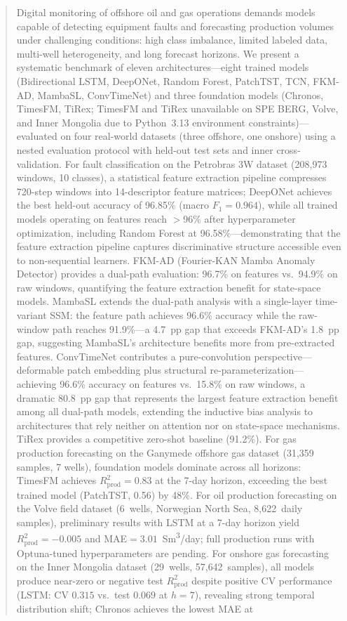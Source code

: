 \documentclass[conference]{IEEEtran}
\begin{document}
\begin{abstract}
Digital monitoring of offshore oil and gas operations demands models capable of detecting equipment faults and forecasting production volumes under challenging conditions: high class imbalance, limited labeled data, multi-well heterogeneity, and long forecast horizons. We present a systematic benchmark of eleven architectures---eight trained models (Bidirectional LSTM, DeepONet, Random Forest, PatchTST, TCN, FKM-AD, MambaSL, ConvTimeNet) and three foundation models (Chronos, TimesFM, TiRex; TimesFM and TiRex unavailable on SPE BERG, Volve, and Inner Mongolia due to Python~3.13 environment constraints)---evaluated on four real-world datasets (three offshore, one onshore) using a nested evaluation protocol with held-out test sets and inner cross-validation. For fault classification on the Petrobras 3W dataset (208{,}973 windows, 10 classes), a statistical feature extraction pipeline compresses 720-step windows into 14-descriptor feature matrices; DeepONet achieves the best held-out accuracy of 96.85\% (macro $F_1{=}0.964$), while all trained models operating on features reach $>$96\% after hyperparameter optimization, including Random Forest at 96.58\%---demonstrating that the feature extraction pipeline captures discriminative structure accessible even to non-sequential learners. FKM-AD (Fourier-KAN Mamba Anomaly Detector) provides a dual-path evaluation: 96.7\% on features vs.\ 94.9\% on raw windows, quantifying the feature extraction benefit for state-space models. MambaSL \cite{mambasl} extends the dual-path analysis with a single-layer time-variant SSM: the feature path achieves 96.6\% accuracy while the raw-window path reaches 91.9\%---a 4.7~pp gap that exceeds FKM-AD's 1.8~pp gap, suggesting MambaSL's architecture benefits more from pre-extracted features. ConvTimeNet \cite{convtimenet} contributes a pure-convolution perspective---deformable patch embedding plus structural re-parameterization---achieving 96.6\% accuracy on features vs.\ 15.8\% on raw windows, a dramatic 80.8~pp gap that represents the largest feature extraction benefit among all dual-path models, extending the inductive bias analysis to architectures that rely neither on attention nor on state-space mechanisms. TiRex provides a competitive zero-shot baseline (91.2\%). For gas production forecasting on the Ganymede offshore gas dataset (31{,}359 samples, 7 wells), foundation models dominate across all horizons: TimesFM achieves $R^2_\text{prod}{=}0.83$ at the 7-day horizon, exceeding the best trained model (PatchTST, 0.56) by 48\%. For oil production forecasting on the Volve field dataset \cite{volve} (6~wells, Norwegian North Sea, 8{,}622~daily samples), preliminary results with LSTM at a 7-day horizon yield $R^2_\text{prod}{=}-0.005$ and MAE${=}3.01$~Sm\textsuperscript{3}/day; full production runs with Optuna-tuned hyperparameters are pending. For onshore gas forecasting on the Inner Mongolia dataset (29~wells, 57{,}642~samples), all models produce near-zero or negative test $R^2_\text{prod}$ despite positive CV performance (LSTM: CV $0.315$ vs.\ test $0.069$ at $h{=}7$), revealing strong temporal distribution shift; Chronos achieves the lowest MAE at 
\end{abstract}
\end{document}
